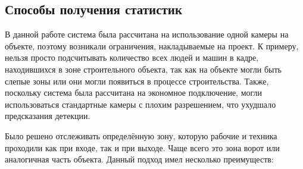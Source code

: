 

\subsection{Способы получения статистик}
\label{subsec:getting_data_from_objects}

В данной работе система была рассчитана на использование одной камеры на объекте,
поэтому возникали ограничения, накладываемые на проект.
К примеру, нельзя просто подсчитывать количество всех людей и машин в кадре,
находившихся в зоне строительного объекта,
так как на объекте могли быть слепые зоны или они могли появиться в процессе строительства.
Также, поскольку система была рассчитана на экономное подключение, могли использоваться стандартные камеры с плохим разрешением,
что ухудшало предсказания детекции.

Было решено отслеживать определённую зону, которую рабочие и техника проходили как при входе, так и при выходе.
Чаще всего это зона ворот или аналогичная часть объекта. Данный подход имел несколько преимуществ:

